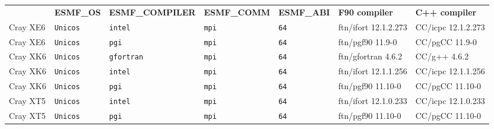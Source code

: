 \begin{tabular}{lllllll}
  &{\bfseries\footnotesize ESMF\_OS} &{\bfseries\footnotesize ESMF\_COMPILER} & {\bfseries\footnotesize ESMF\_COMM} & {\bfseries\footnotesize ESMF\_ABI} &
  {\bfseries\footnotesize F90 compiler} & {\bfseries\footnotesize C++ compiler} \\

Cray XE6              &\tt Unicos &\tt intel        &\tt mpi        &\tt 64              & ftn/ifort \footnotesize 12.1.2.273 & CC/icpc \footnotesize 12.1.2.273\\ %
Cray XE6              &\tt Unicos &\tt pgi          &\tt mpi        &\tt 64              & ftn/pgf90 \footnotesize 11.9-0     & CC/pgCC \footnotesize 11.9-0    \\ %
Cray XK6              &\tt Unicos &\tt gfortran     &\tt mpi        &\tt 64              & ftn/gfortran \footnotesize 4.6.2   & CC/g++ \footnotesize 4.6.2      \\ %
Cray XK6              &\tt Unicos &\tt intel        &\tt mpi        &\tt 64              & ftn/ifort \footnotesize 12.1.1.256 & CC/icpc \footnotesize 12.1.1.256\\ %
Cray XK6              &\tt Unicos &\tt pgi          &\tt mpi        &\tt 64              & ftn/pgf90 \footnotesize 11.10-0    & CC/pgCC \footnotesize 11.10-0   \\ %
Cray XT5              &\tt Unicos &\tt intel        &\tt mpi        &\tt 64              & ftn/ifort \footnotesize 12.1.0.233 & CC/icpc \footnotesize 12.1.0.233\\ %
Cray XT5              &\tt Unicos &\tt pgi          &\tt mpi        &\tt 64              & ftn/pgf90 \footnotesize 11.10-0    & CC/pgCC \footnotesize 11.10-0   \\ %

\end{tabular}
